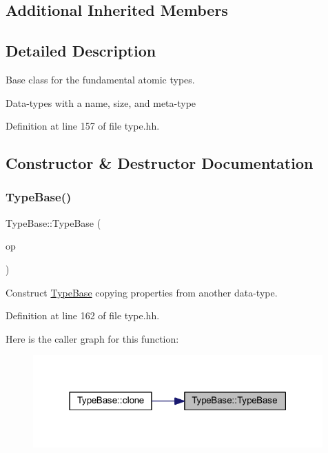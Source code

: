 \subsection*{Additional Inherited Members}


\subsection{Detailed Description}
Base class for the fundamental atomic types. 

Data-\/types with a name, size, and meta-\/type 

Definition at line 157 of file type.\+hh.



\subsection{Constructor \& Destructor Documentation}
\mbox{\label{class_type_base_acb68fe0901b43e35623b6373495c1d6f}} 
\subsubsection{\texorpdfstring{TypeBase()}{TypeBase()}\hspace{0.1cm}{\footnotesize\ttfamily [1/3]}}
{\footnotesize\ttfamily Type\+Base\+::\+Type\+Base (\begin{DoxyParamCaption}\item[{const \mbox{\hyperlink{class_type_base}{Type\+Base}} \&}]{op }\end{DoxyParamCaption})\hspace{0.3cm}{\ttfamily [inline]}}



Construct \mbox{\hyperlink{class_type_base}{Type\+Base}} copying properties from another data-\/type. 



Definition at line 162 of file type.\+hh.

Here is the caller graph for this function\+:
\nopagebreak
\begin{figure}[H]
\begin{center}
\leavevmode
\includegraphics[width=315pt]{class_type_base_acb68fe0901b43e35623b6373495c1d6f_icgraph}
\end{center}
\end{figure}
\mbox{\label{class_type_base_abb8a8ebca133d6410978e0b53f453d8c}} 
